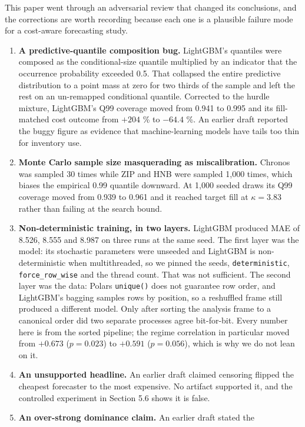 \documentclass[11pt]{article}
\begin{document}
This paper went through an adversarial review that changed its conclusions, and
the corrections are worth recording because each one is a plausible failure
mode for a cost-aware forecasting study.

\begin{enumerate}
\item \textbf{A predictive-quantile composition bug.} LightGBM's quantiles were
  composed as the conditional-size quantile multiplied by an indicator that the
  occurrence probability exceeded 0.5. That collapsed the entire predictive
  distribution to a point mass at zero for two thirds of the sample and left
  the rest on an un-remapped conditional quantile. Corrected to the hurdle
  mixture, LightGBM's Q99 coverage moved from 0.941 to 0.995 and its
  fill-matched cost outcome from $+204$ \% to $-64.4$ \%. An earlier draft
  reported the buggy figure as evidence that machine-learning models have tails
  too thin for inventory use.
\item \textbf{Monte Carlo sample size masquerading as miscalibration.} Chronos
  was sampled 30 times while ZIP and HNB were sampled 1{,}000 times, which
  biases the empirical 0.99 quantile downward. At 1{,}000 seeded draws its Q99
  coverage moved from 0.939 to 0.961 and it reached target fill at
  $\kappa = 3.83$ rather than failing at the search bound.
\item \textbf{Non-deterministic training, in two layers.} LightGBM produced
  MAE of 8.526, 8.555 and 8.987 on three runs at the same seed. The first layer
  was the model: its stochastic parameters were unseeded and LightGBM is
  non-deterministic when multithreaded, so we pinned the seeds,
  \texttt{deterministic}, \texttt{force\_row\_wise} and the thread count. That
  was not sufficient. The second layer was the data: Polars \texttt{unique()}
  does not guarantee row order, and LightGBM's bagging samples rows by
  position, so a reshuffled frame still produced a different model. Only after
  sorting the analysis frame to a canonical order did two separate processes
  agree bit-for-bit. Every number here is from the sorted pipeline; the regime
  correlation in particular moved from $+0.673$ ($p = 0.023$) to $+0.591$
  ($p = 0.056$), which is why we do not lean on it.
\item \textbf{An unsupported headline.} An earlier draft claimed censoring
  flipped the cheapest forecaster to the most expensive. No artifact supported
  it, and the controlled experiment in Section 5.6 shows it is false.
\item \textbf{An over-strong dominance claim.} An earlier draft stated the

\end{enumerate}
\end{document}
